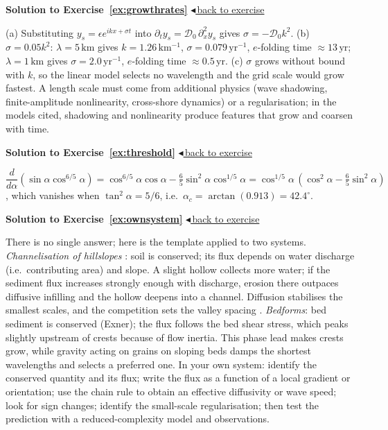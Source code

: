 \documentclass[11pt,letterpaper]{article}
\numberwithin{equation}{section}
\newcommand{\units}[1]{\,\mathrm{#1}}
\newenvironment{solution}[1]{%
  \par\addvspace{1.0ex}\noindent\phantomsection\label{sol:#1}%
  {\color{exorange!85!black}\bfseries Solution to Exercise~\ref{ex:#1}}%
  \hfill\hyperref[ex:#1]{\small$\blacktriangleleft$\,back to exercise}\par\nopagebreak\smallskip}%
  {\par\smallskip\noindent{\color{exorange!40}\rule{\linewidth}{0.4pt}}\par}
\begin{document}
\begin{solution}{growthrates}
(a) Substituting $y_s=\epsilon e^{ikx+\sigma t}$ into $\partial_ty_s=\mathcal D_0\,\partial_x^2y_s$ gives $\sigma=-\mathcal D_0k^2$.
(b) $\sigma=0.05k^2$: $\lambda=5\units{km}$ gives $k=1.26\units{km^{-1}}$, $\sigma=0.079\units{yr^{-1}}$, $e$-folding time $\approx13\units{yr}$; $\lambda=1\units{km}$ gives
$\sigma=2.0\units{yr^{-1}}$, $e$-folding time $\approx0.5\units{yr}$.
(c) $\sigma$ grows without bound with $k$, so the linear model selects no wavelength and the grid scale would grow fastest. A length scale must come from additional
physics (wave shadowing, finite-amplitude nonlinearity, cross-shore dynamics) or a regularisation; in the models cited, shadowing and nonlinearity produce features
that grow and coarsen with time.
\end{solution}

\begin{solution}{threshold}
$\dfrac{d}{d\alpha}(\sin\alpha\cos^{6/5}\!\alpha)=\cos^{6/5}\!\alpha\cos\alpha-\tfrac65\sin^2\alpha\cos^{1/5}\!\alpha=\cos^{1/5}\!\alpha\,(\cos^2\alpha-\tfrac65\sin^2\alpha)$, which
vanishes when $\tan^2\alpha=5/6$, i.e.\ $\alpha_c=\arctan(0.913)=42.4^\circ$.
\end{solution}

\begin{solution}{ownsystem}
There is no single answer; here is the template applied to two systems.
\emph{Channelisation of hillslopes} \citep{smith1972}: soil is conserved; its flux depends on water discharge (i.e.\ contributing area) and slope. A
slight hollow collects more water; if the sediment flux increases strongly enough with discharge, erosion there outpaces diffusive infilling and the hollow deepens
into a channel. Diffusion stabilises the smallest scales, and the competition sets the valley spacing \citep{perron2009}.
\emph{Bedforms}: bed sediment is conserved (Exner); the flux follows the bed shear stress, which peaks slightly upstream of crests because of flow inertia. This
phase lead makes crests grow, while gravity acting on grains on sloping beds damps the shortest wavelengths and selects a preferred one.
In your own system: identify the conserved quantity and its flux; write the flux as a function of a local gradient or orientation; use the chain rule to obtain an
effective diffusivity or wave speed; look for sign changes; identify the small-scale regularisation; then test the prediction with a reduced-complexity model and
observations.
\end{solution}
\end{document}
